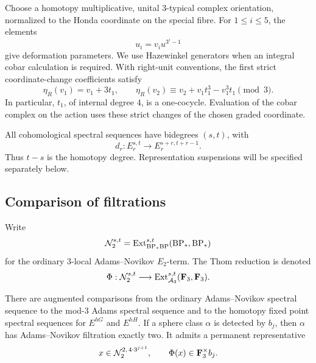 Choose a homotopy multiplicative, unital \(3\)-typical complex
orientation, normalized to the Honda coordinate on the special
fibre.  For \(1\leq i\leq5\), the elements
\[
 u_i=v_i u^{3^i-1}
\]
give deformation parameters.  We use Hazewinkel generators when an
integral cobar calculation is required.  With right-unit conventions,
the first strict coordinate-change coefficients satisfy
\begin{equation}\label{det:right-units}
 \eta_R(v_1)=v_1+3t_1,\qquad
 \eta_R(v_2)\equiv
 v_2+v_1t_1^3-v_1^3t_1\pmod3 .
\end{equation}
In particular, \(t_1\), of internal degree \(4\), is a
one-cocycle.  Evaluation of the cobar complex on the action uses these
strict changes of the chosen graded coordinate.

All cohomological spectral sequences have bidegrees \((s,t)\), with
\[
 d_r:E_r^{s,t}\longrightarrow E_r^{s+r,t+r-1}.
\]
Thus \(t-s\) is the homotopy degree.  Representation suspensions will
be specified separately below.

\subsection{Comparison of filtrations}

Write
\[
 \mathcal N_2^{s,t}
 =\operatorname{Ext}_{\mathrm{BP}_*\mathrm{BP}}^{s,t}(\mathrm{BP}_*,\mathrm{BP}_*)
\]
for the ordinary \(3\)-local Adams--Novikov \(E_2\)-term.
The Thom reduction is denoted
\[
 \Phi:\mathcal N_2^{s,t}
 \longrightarrow
 \operatorname{Ext}_{\mathcal A_3}^{s,t}(\mathbf F_3,\mathbf F_3).
\]

\begin{lemma}[Comparison]\label{det:filtration-comparison}
There are augmented comparisons from the ordinary
Adams--Novikov spectral sequence to the mod-\(3\) Adams spectral
sequence and to the homotopy fixed point spectral sequences for
\(E^{hG}\) and \(E^{hH}\).
If a sphere class \(\alpha\) is detected by \(b_j\), then
\(\alpha\) has Adams--Novikov filtration exactly two.
It admits a permanent representative
\[
 x\in\mathcal N_2^{2,\,4\cdot3^{j+1}},
 \qquad \Phi(x)\in\mathbf F_3^\times b_j .
\]
\end{lemma}

